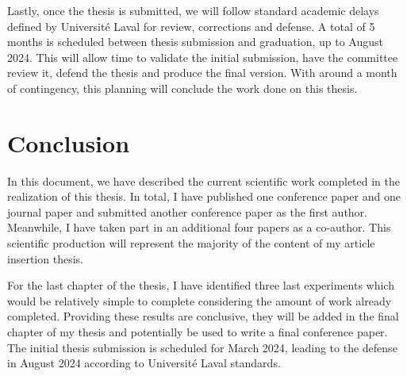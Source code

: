\documentclass[12pt,letterpaper,oneside]{article}
\begin{document}
Lastly, once the thesis is submitted, we will follow standard academic delays defined by Université Laval for review, corrections and defense.
A total of 5 months is scheduled between thesis submission and graduation, up to August 2024.
This will allow time to validate the initial submission, have the committee review it, defend the thesis and produce the final version.
With around a month of contingency, this planning will conclude the work done on this thesis.

\section{Conclusion}
\label{sec:conclusion}

In this document, we have described the current scientific work completed in the realization of this thesis.
In total, I have published one conference paper and one journal paper and submitted another conference paper as the first author.
Meanwhile, I have taken part in an additional four papers as a co-author.
This scientific production will represent the majority of the content of my article insertion thesis.

For the last chapter of the thesis, I have identified three last experiments which would be relatively simple to complete considering the amount of work already completed.
Providing these results are conclusive, they will be added in the final chapter of my thesis and potentially be used to write a final conference paper.
The initial thesis submission is scheduled for March 2024, leading to the defense in August 2024 according to Université Laval standards.


\printbibliography

%
\end{document}
